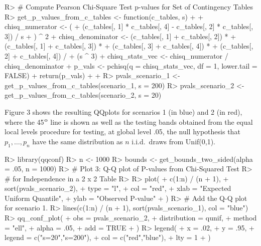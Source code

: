 \documentclass[article]{jss}
\begin{document}
%
\begin{Schunk}
\begin{Sinput}
R> # Compute Pearson Chi-Square Test p-values for Set of Contingency Tables
R> get_p_values_from_c_tables <- function(c_tables, s) {
+    
+    chisq_numerator <- (
+      (c_tables[, 1] * c_tables[, 4] - c_tables[, 2] * c_tables[, 3]) / s
+    ) ^ 2
+    chisq_denominator <- (c_tables[, 1] + c_tables[, 2]) * 
+      (c_tables[, 1] + c_tables[, 3]) * 
+      (c_tables[, 3] + c_tables[, 4]) * 
+      (c_tables[, 2] + c_tables[, 4]) / 
+      (s ^ 3)
+    chisq_stats_vec <- chisq_numerator / chisq_denominator
+    p_vals <- pchisq(q = chisq_stats_vec, df = 1, lower.tail = FALSE)
+    return(p_vals)
+    
+  }
R> pvals_scenario_1 <- get_p_values_from_c_tables(scenario_1, s = 200)
R> pvals_scenario_2 <- get_p_values_from_c_tables(scenario_2, s = 20)
\end{Sinput}
\end{Schunk}
%


Figure 3 shows the resulting QQplots for scenarios 1 (in blue) and 2 (in red), where the 45$^{\mbox{\footnotesize o}}$ line is shown as well as the testing bands obtained from the equal local levels procedure for testing, at global level .05, the null hypothesis that $p_1, \ldots, p_n$ have the same distribution as $n$ i.i.d.\ draws from Unif(0,1).  

\begin{Schunk}
\begin{Sinput}
R> library(qqconf)
R> n <- 1000
R> bounds <- get_bounds_two_sided(alpha = .05, n = 1000)
R> # Plot 3: Q-Q plot of P-values from Chi-Squared Test
R> # for Independence in a 2 x 2 Table
R> 
R> plot(
+    c(1:n) / (n + 1), 
+    sort(pvals_scenario_2), 
+    type = "l", 
+    col = "red", 
+    xlab = "Expected Uniform Quantile",
+    ylab = "Observed P-value"
+  )
R> # Add the Q-Q plot for scenario 1.
R> lines(c(1:n) / (n + 1), sort(pvals_scenario_1), col = "blue")
R> qq_conf_plot(
+    obs = pvals_scenario_2,
+    distribution = qunif,
+    method = "ell",
+    alpha = .05, 
+    add = TRUE
+  )
R> legend(
+    x = .02, 
+    y = .95, 
+    legend = c("s=20","s=200"), 
+    col = c("red","blue"), 
+    lty = 1
+  )
\end{Sinput}
\end{Schunk}
\end{document}
